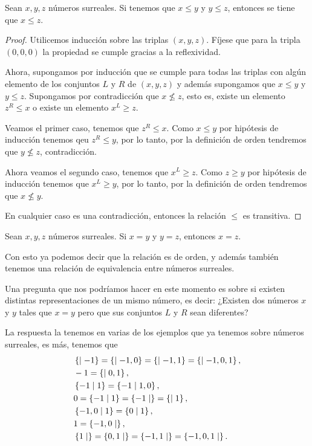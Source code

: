    \begin{theorem}[Transitividad]
        Sean $x,y,z$ n\'umeros surreales. Si tenemos que $x\le y$ y $y\le z$, entonces se tiene que $x\le z$.
    \end{theorem}

    \begin{proof}
        Utilicemos inducci\'on sobre las triplas $(x,y,z)$. F\'ijese que para la tripla $(0,0,0)$ la propiedad se cumple gracias a la reflexividad.

        Ahora, supongamos por inducci\'on que se cumple para todas las triplas con alg\'un elemento de los conjuntos $L$ y $R$ de $(x,y,z)$ y adem\'as supongamos que $x\le y$ y $y\le z$. Supongamos por contradicci\'on que $x\not\le z$, esto es, existe un elemento $z^R \le x$ o existe un elemento $x^L \ge z$.

        Veamos el primer caso, tenemos que $z^R \le x$. Como $x \le y$ por hip\'otesis de inducci\'on tenemos qeu $z^R \le y$, por lo tanto, por la definici\'on de orden tendremos que $y \not\le z$, contradicci\'on.

        Ahora veamos el segundo caso, tenemos que $x^L \ge z$. Como $z \ge y$ por hip\'otesis de inducci\'on tenemos que $x^L \ge y$, por lo tanto, por la definici\'on de orden tendremos que $x\not\le y$.

        En cualquier caso es una contradicci\'on, entonces la relaci\'on $\le$ es transitiva.
    \end{proof}

    \begin{corollary}
        Sean $x,y,z$ n\'umeros surreales. Si $x = y$ y $y = z$, entonces $x = z$.
    \end{corollary}

    Con esto ya podemos decir que la relaci\'on es de orden, y adem\'as tambi\'en tenemos una relaci\'on de equivalencia entre n\'umeros surreales.

    Una pregunta que nos podr\'iamos hacer en este momento es sobre si existen distintas representaciones de un mismo n\'umero, es decir: ¿Existen dos n\'umeros $x$ y $y$ tales que $x=y$ pero que sus conjuntos $L$ y $R$ sean diferentes?

    La respuesta la tenemos en varias de los ejemplos que ya tenemos sobre n\'umeros surreales, es m\'as, tenemos que
    \begin{align*}
        &\left\{\mid -1\right\} = \left\{\mid -1,0\right\} = \left\{\mid -1,1\right\} = \left\{\mid -1,0,1\right\}, \\
        &-1 = \left\{\mid 0,1\right\},\\
        &\left\{-1\mid 1\right\} = \left\{-1\mid 1,0\right\},\\
        &0 = \left\{-1\mid 1\right\} = \left\{-1\mid \right\} = \left\{\mid 1\right\},\\
        &\left\{-1,0\mid 1\right\} = \left\{0\mid 1\right\},\\
        &1 = \left\{-1,0\mid \right\},\\
        &\left\{1\mid \right\} = \left\{0,1\mid \right\} = \left\{-1,1\mid \right\} = \left\{-1,0,1\mid \right\}.
    \end{align*}

